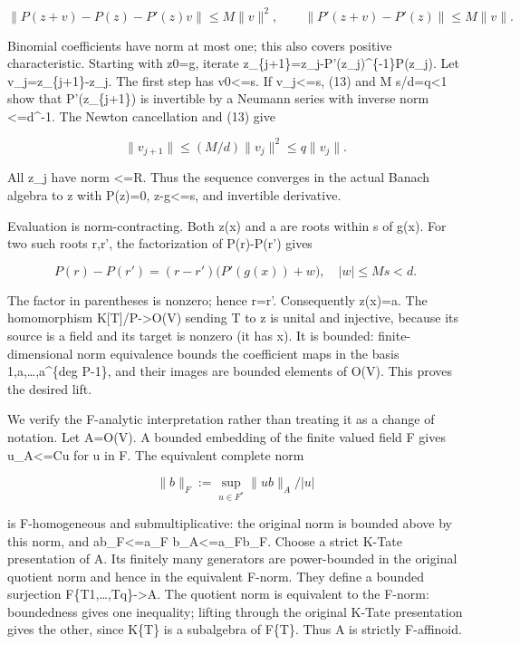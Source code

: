 \documentclass[
  10pt,
]{article}
\begin{document}
\[
 \|P(z+v)-P(z)-P'(z)v\|\leq M\|v\|^2,
 \qquad \|P'(z+v)-P'(z)\|\leq M\|v\|.                       \tag{13}
\]

Binomial coefficients have norm at most one; this also covers positive
characteristic. Starting with z0=g, iterate
z\_\{j+1\}=z\_j-P'(z\_j)\^{}\{-1\}P(z\_j). Let v\_j=z\_\{j+1\}-z\_j. The
first step has \textbar\textbar v0\textbar\textbar\textless=s. If
\textbar\textbar v\_j\textbar\textbar\textless=s, (13) and M
s/d=q\textless1 show that P'(z\_\{j+1\}) is invertible by a Neumann
series with inverse norm \textless=d\^{}-1. The Newton cancellation and
(13) give

\[
 \|v_{j+1}\|\leq (M/d)\|v_j\|^2\leq q\|v_j\|.              \tag{14}
\]

All z\_j have norm \textless=R. Thus the sequence converges in the
actual Banach algebra to z with P(z)=0,
\textbar\textbar z-g\textbar\textbar\textless=s, and invertible
derivative.

Evaluation is norm-contracting. Both z(x) and a are roots within s of
g(x). For two such roots r,r', the factorization of P(r)-P(r') gives

\[
 P(r)-P(r')=(r-r')\bigl(P'(g(x))+w\bigr),\quad |w|\leq Ms<d.
\]

The factor in parentheses is nonzero; hence r=r'. Consequently z(x)=a.
The homomorphism K{[}T{]}/P-\textgreater O(V) sending T to z is unital
and injective, because its source is a field and its target is nonzero
(it has x). It is bounded: finite-dimensional norm equivalence bounds
the coefficient maps in the basis 1,a,\ldots,a\^{}\{deg P-1\}, and their
images are bounded elements of O(V). This proves the desired lift.

We verify the F-analytic interpretation rather than treating it as a
change of notation. Let A=O(V). A bounded embedding of the finite valued
field F gives
\textbar\textbar u\textbar\textbar\_A\textless=C\textbar u\textbar{} for
u in F. The equivalent complete norm

\[
 \|b\|_F:=\sup_{u\in F^*}\|ub\|_A/|u|
\]

is F-homogeneous and submultiplicative: the original norm is bounded
above by this norm, and
\textbar\textbar ab\textbar\textbar\_F\textless=\textbar\textbar a\textbar\textbar\_F
\textbar\textbar b\textbar\textbar\_A\textless=\textbar\textbar a\textbar\textbar\_F\textbar\textbar b\textbar\textbar\_F.
Choose a strict K-Tate presentation of A. Its finitely many generators
are power-bounded in the original quotient norm and hence in the
equivalent F-norm. They define a bounded surjection
F\{T1,\ldots,Tq\}-\textgreater A. The quotient norm is equivalent to the
F-norm: boundedness gives one inequality; lifting through the original
K-Tate presentation gives the other, since K\{T\} is a subalgebra of
F\{T\}. Thus A is strictly F-affinoid.
\end{document}
